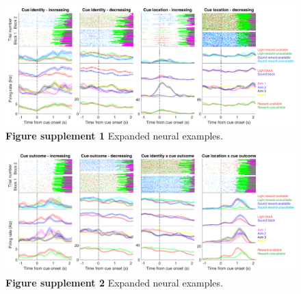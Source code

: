 \documentclass[11pt]{article}
\newcommand{\bsf}[1]{\textbf{#1}}
\providecommand{\DIFaddbeginFL}{} %
\providecommand{\DIFdelbeginFL}{} %
\providecommand{\DIFdelendFL}{} %
\newcommand{\DIFscaledelfig}{0.5}
\newlength{\DIFdelgraphicswidth} %
\newlength{\DIFdelgraphicsheight} %
\newcommand{\DIFaddincludegraphics}[2][]{{\color{blue}\fbox{\DIFOincludegraphics[#1]{#2}}}} %
\newcommand{\DIFdelincludegraphics}[2][]{%
\sbox{\DIFdelgraphicsbox}{\DIFOincludegraphics[#1]{#2}}%
\settoboxwidth{\DIFdelgraphicswidth}{\DIFdelgraphicsbox} %
\settoboxtotalheight{\DIFdelgraphicsheight}{\DIFdelgraphicsbox} %
\scalebox{\DIFscaledelfig}{%
\parbox[b]{\DIFdelgraphicswidth}{\usebox{\DIFdelgraphicsbox}\\[-\baselineskip] \rule{\DIFdelgraphicswidth}{0em}}\llap{\resizebox{\DIFdelgraphicswidth}{\DIFdelgraphicsheight}{%
\setlength{\unitlength}{\DIFdelgraphicswidth}%
\begin{picture}(1,1)%
\thicklines\linethickness{2pt} %
{\color[rgb]{1,0,0}\put(0,0){\framebox(1,1){}}}%
{\color[rgb]{1,0,0}\put(0,0){\line( 1,1){1}}}%
{\color[rgb]{1,0,0}\put(0,1){\line(1,-1){1}}}%
\end{picture}%
}\hspace*{3pt}}} %
} %
\DeclareRobustCommand{\DIFaddbeginFL}{\DIFOaddbeginFL \let\includegraphics\DIFaddincludegraphics} %
\DeclareRobustCommand{\DIFdelbeginFL}{\DIFOdelbeginFL \let\includegraphics\DIFdelincludegraphics} %
\DeclareRobustCommand{\DIFdelendFL}{\DIFOaddendFL \let\includegraphics\DIFOincludegraphics} %
\begin{document}
 \begin{figure}[ht!]
\centering
\DIFdelbeginFL %
\DIFdelendFL \DIFaddbeginFL \includegraphics[width=\textwidth]{Fig 4 - Neural examples SUPP1.pdf}
\caption*{\bsf{Figure supplement 1} Expanded neural examples.}
\label{fig:examplesSUPP1}
\end{figure} \clearpage

 \begin{figure}[ht!]
\centering
\includegraphics[width=\textwidth]{Fig 4 - Neural examples SUPP2.pdf}
\caption*{\bsf{Figure supplement 2} Expanded neural examples.}
\label{fig:examplesSUPP2}
\end{figure} \clearpage
\end{document}
